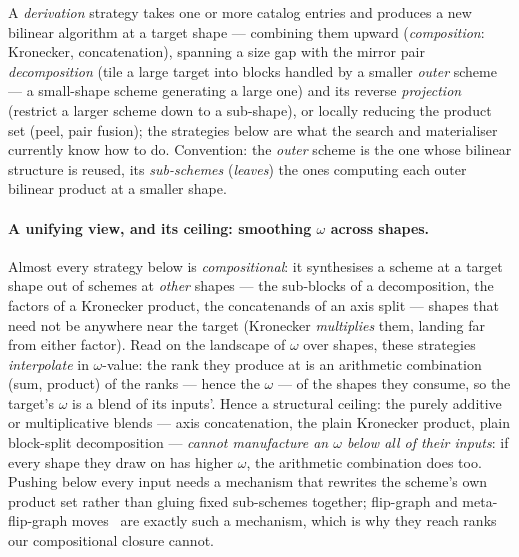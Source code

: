 
A \emph{derivation} strategy takes one or more catalog entries and produces a new bilinear
algorithm at a target shape --- combining them upward (\emph{composition}: Kronecker,
concatenation), spanning a size gap with the mirror pair \emph{decomposition} (tile a large
target into blocks handled by a smaller \emph{outer} scheme --- a small-shape scheme
generating a large one) and its reverse \emph{projection} (restrict a larger scheme down to
a sub-shape), or locally reducing the product set (peel, pair fusion); the strategies below
are what the search and materialiser currently know how to do. Convention: the \emph{outer}
scheme is the one whose bilinear structure is reused, its \emph{sub-schemes}
(\emph{leaves}) the ones computing each outer bilinear product at a smaller shape.

\paragraph{A unifying view, and its ceiling: smoothing \(\omega\) across shapes.}
Almost every strategy below is \emph{compositional}: it synthesises a scheme at a target
shape out of schemes at \emph{other} shapes --- the sub-blocks of a decomposition, the
factors of a Kronecker product, the concatenands of an axis split --- shapes that need not
be anywhere near the target (Kronecker \emph{multiplies} them, landing far from either
factor). Read on the landscape of \(\omega\) over shapes, these strategies \emph{interpolate}
in \(\omega\)-value: the rank they produce at  is an arithmetic combination
(sum, product) of the ranks --- hence the \(\omega\) --- of the shapes they consume, so the
target's \(\omega\) is a blend of its inputs'. Hence a structural ceiling: the purely additive or
multiplicative blends --- axis concatenation, the plain Kronecker product, plain block-split
decomposition --- \emph{cannot manufacture an \(\omega\) below all of their inputs}: if
every shape they draw on has higher \(\omega\), the arithmetic combination does too. Pushing below every input needs a mechanism that rewrites the scheme's own product
set rather than gluing fixed sub-schemes together; flip-graph and meta-flip-graph
moves~\cite{perminov2025fast,kauersmoosbauerwood2026} are exactly such a mechanism, which is
why they reach ranks our compositional closure cannot.

